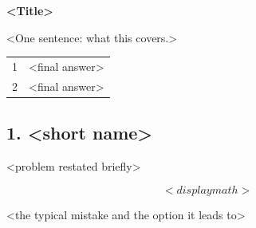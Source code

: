 \documentclass[11pt,a4paper]{article}
\begin{document}
{\LARGE\bfseries\sffamily\color{accent} <Title>}\par\smallskip
<One sentence: what this covers.>

\begin{keyres}
\begin{tabularx}{\linewidth}{lX}\toprule
1 & <final answer>\\
2 & <final answer>\\\bottomrule
\end{tabularx}
\end{keyres}

\subsection*{1. <short name>}
\begin{task}[ 1]
<problem restated briefly>
\end{task}
\[ <display math> \]
\begin{trap}
<the typical mistake and the option it leads to>
\end{trap}

\end{document}
